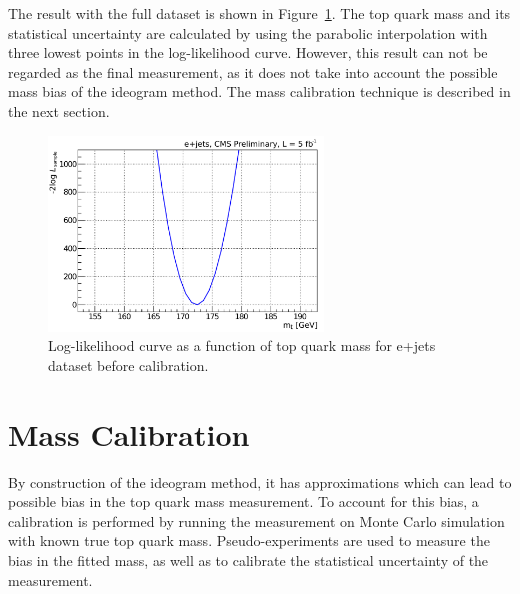 The result with the full dataset is shown in Figure~\ref{fig:LogLikelihood}. The top quark mass and its statistical
uncertainty are calculated by using the parabolic interpolation with three lowest points in the log-likelihood curve.
However, this result can not be regarded as the final measurement, as it does not take into account the possible mass
bias of the ideogram method. The mass calibration technique is described in the next section.

\begin{figure}[!htpb]
	\centering
	\includegraphics[width=0.65\textwidth]{Likelihood}
	\caption{\label{fig:LogLikelihood}
	Log-likelihood curve as a function of top quark mass for e+jets dataset before calibration.}
\end{figure}

\section{Mass Calibration}
\label{s_top_mass:calibration}

By construction of the ideogram method, it has approximations which can lead to possible bias in the top quark mass
measurement. To account for this bias, a calibration is performed by running the measurement on Monte Carlo simulation
with known true top quark mass. Pseudo-experiments are used to measure the bias in the fitted mass, as well as to
calibrate the statistical uncertainty of the measurement.

